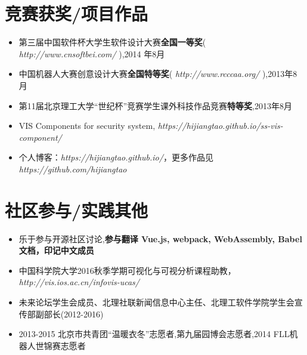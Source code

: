 \documentclass{resume}
\begin{document}
    \section{竞赛获奖/项目作品}
    \begin{itemize}[parsep=0.2ex]
        \item 第三届中国软件杯大学生软件设计大赛\textbf{全国一等奖}( \textit{http://www.cnsoftbei.com/} ),2014 年8月
        \item 中国机器人大赛创意设计大赛\textbf{全国特等奖}( \textit{http://www.rcccaa.org/} ),2013年8月
        \item 第11届北京理工大学“世纪杯”竞赛学生课外科技作品竞赛\textbf{特等奖},2013年8月
        \item VIS Components for security system, \textit{https://hijiangtao.github.io/ss-vis-component/}
        \item 个人博客：\textit{https://hijiangtao.github.io/}，更多作品见 \textit{https://github.com/hijiangtao}
    \end{itemize}


    \section{社区参与/实践其他}
    \begin{itemize}[parsep=0.2ex]
        \item 乐于参与开源社区讨论,\textbf{参与翻译 Vue.js, webpack, WebAssembly, Babel 文档，印记中文成员}
        \item 中国科学院大学2016秋季学期可视化与可视分析课程助教，\textit{http://vis.ios.ac.cn/infovis-ucas/}
        \item 未来论坛学生会成员、北理社联新闻信息中心主任、北理工软件学院学生会宣传部副部长(2012-2016)
        \item 2013-2015 北京市共青团“温暖衣冬”志愿者,第九届园博会志愿者,2014 FLL机器人世锦赛志愿者
    \end{itemize}
\end{document}
